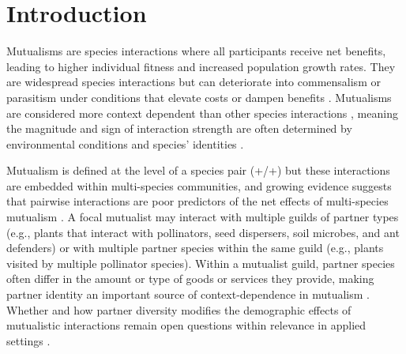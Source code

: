 \documentclass[11pt]{article}
\begin{document}
	
	\newpage{}
	\section*{Introduction}
	Mutualisms are species interactions where all participants receive net benefits, leading to higher individual fitness and increased population growth rates. 
	They are widespread species interactions \citep{Bronstein1994,Chamberlain2014,Frederickson2013,Axelrod1981,Leigh2010} but can deteriorate into commensalism or parasitism under conditions that elevate costs or dampen benefits \citep{Rodriguez-Rodriguez2017,Song2020,Mandyam2014,Thrall2007, Bahia2022}.
	Mutualisms are considered more context dependent than other species interactions \citep{Chamberlain2014,Frederickson2013}, meaning the magnitude and sign of interaction strength are often determined by environmental conditions and species' identities \citep{Noe1994,Leigh2010}.
	
	Mutualism is defined at the level of a species pair (+/+) but these interactions are embedded within multi-species communities, and growing evidence suggests that pairwise interactions are poor predictors of the net effects of multi-species mutualism \citep{Afkhami2014,Palmer2010,Bascompte2009,Dattilo2014}. 
	A focal mutualist may interact with multiple guilds of partner types (e.g., plants that interact with pollinators, seed dispersers, soil microbes, and ant defenders) or with multiple partner species within the same guild (e.g., plants visited by multiple pollinator species). 
	Within a mutualist guild, partner species often differ in the amount or type of goods or services they provide, making partner identity an important source of context-dependence in mutualism \citep{Stanton2003}. 
	Whether and how partner diversity modifies the demographic effects of mutualistic interactions remain open questions within relevance in applied settings \citep{rogers2014}. 
	
\end{document}
